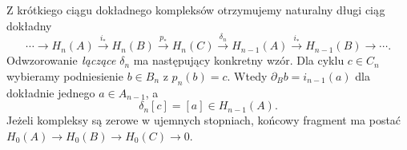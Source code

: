 \begin{twierdzenie}
\label{thm:les-homologia}
Z krótkiego ciągu dokładnego kompleksów
otrzymujemy naturalny długi ciąg dokładny
\begin{equation}\label{eq:les-homologia}
 \cdots\longrightarrow H_n(A)
 \xrightarrow{i_*}H_n(B)
 \xrightarrow{p_*}H_n(C)
 \xrightarrow{\delta_n}H_{n-1}(A)
 \xrightarrow{i_*}H_{n-1}(B)
 \longrightarrow\cdots.
\end{equation}
Odwzorowanie \emph{łączące} $\delta_n$ ma następujący
konkretny wzór. Dla cyklu $c\in C_n$ wybieramy
podniesienie $b\in B_n$ z $p_n(b)=c$.
Wtedy $\partial_B b=i_{n-1}(a)$ dla dokładnie
jednego $a\in A_{n-1}$, a
\begin{equation}\label{eq:delta-wzor}
 \delta_n[c]=[a]\in H_{n-1}(A).
\end{equation}
Jeżeli kompleksy są zerowe w ujemnych stopniach,
końcowy fragment ma postać
$H_0(A)\to H_0(B)\to H_0(C)\to0$.
\end{twierdzenie}

